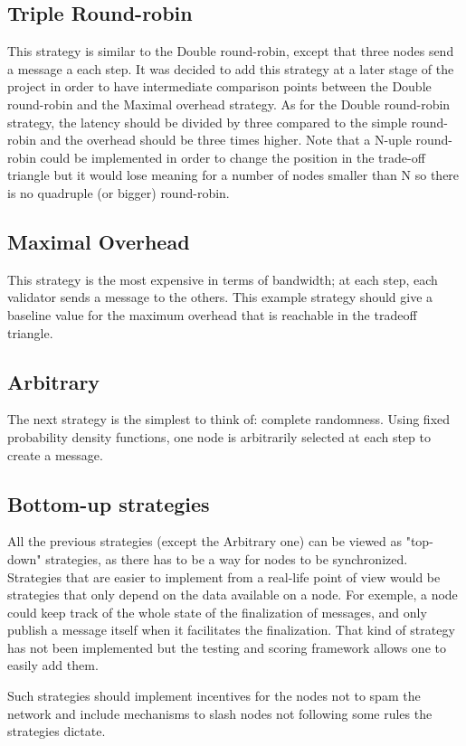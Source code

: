 \subsection{Triple Round-robin}
This strategy is similar to the Double round-robin, except that three nodes send
a message a each step. It was decided to add this strategy at a later stage of
the project in order to have intermediate comparison points between the Double
round-robin and the Maximal overhead strategy. As for the Double round-robin
strategy, the latency should be divided by three compared to the simple
round-robin and the overhead should be three times higher.
Note that a N-uple round-robin could be implemented in order to change the
position in the trade-off triangle but it would lose meaning for a number of
nodes smaller than N so there is no quadruple (or bigger) round-robin.

\subsection{Maximal Overhead}
This strategy is the most expensive in terms of bandwidth; at each step, each
validator sends a message to the others. This example strategy should give a
baseline value for the maximum overhead that is reachable in the tradeoff
triangle.

\subsection{Arbitrary}
The next strategy is the simplest to think of: complete randomness. Using fixed
probability density functions, one node is arbitrarily selected at each step to
create a message. 

\subsection{Bottom-up strategies}
All the previous strategies (except the Arbitrary one) can be viewed as
"top-down" strategies, as there has to be a way for nodes to be synchronized.
Strategies that are easier to implement from a real-life point of view would be
strategies that only depend on the data available on a node. For exemple, a node
could keep track of the whole state of the finalization of messages, and only
publish a message itself when it facilitates the finalization. That kind of
strategy has not been implemented but the testing and scoring framework allows
one to easily add them.

Such strategies should implement incentives for the nodes not to spam the
network and include mechanisms to slash nodes not following some rules the
strategies dictate.

